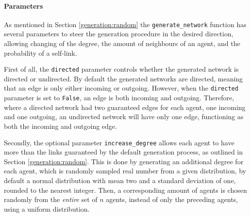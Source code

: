 \documentclass[a4paper, 12pt]{report}
\begin{document}
\newpage

\paragraph{Parameters}

As mentioned in Section \ref{generation:random} the \texttt{generate\_network} function has several parameters to steer the generation procedure in the desired direction, allowing changing of the degree, the amount of neighbours of an agent, and the probability of a self-link. 

First of all, the \texttt{directed} parameter controls whether the generated network is directed or undirected. By default the generated networks are directed, meaning that an edge is only either incoming or outgoing. However, when the \texttt{directed} parameter is set to \texttt{False}, an edge is both incoming and outgoing. Therefore, where a directed network had two guaranteed edges for each agent, one incoming and one outgoing, an undirected network will have only one edge, functioning as both the incoming and outgoing edge.

Secondly, the optional parameter \texttt{increase\_degree} allows each agent to have more than the links guaranteed by the default generation process, as outlined in Section \ref{generation:random}. This is done by generating an additional degree for each agent, which is randomly sampled real number from a given distribution, by default a normal distribution with mean two and a standard deviation of one, rounded to the nearest integer. Then, a corresponding amount of agents is chosen randomly from the \emph{entire} set of $n$ agents, instead of only the preceding agents, using a uniform distribution.
\end{document}
